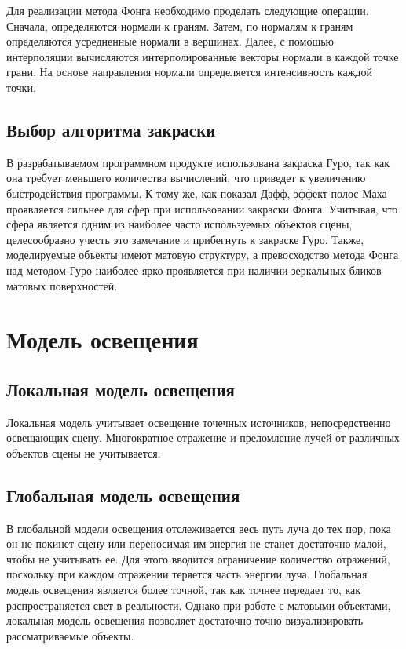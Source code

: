 Для реализации метода Фонга необходимо проделать следующие операции. Сначала, определяются нормали к граням. Затем, по нормалям к граням определяются усредненные нормали в вершинах. Далее, с помощью интерполяции вычисляются интерполированные векторы нормали в каждой точке грани. На основе направления нормали определяется интенсивность каждой точки.






\subsection{Выбор алгоритма закраски}
В разрабатываемом программном продукте использована закраска Гуро, так как она требует меньшего количества вычислений, что приведет к увеличению быстродействия программы. К тому же, как показал Дафф, эффект полос Маха проявляется сильнее для сфер при использовании закраски Фонга. Учитывая, что сфера является одним из наиболее часто используемых объектов сцены, целесообразно учесть это замечание и прибегнуть к закраске Гуро. Также, моделируемые объекты имеют матовую структуру, а превосходство метода Фонга над методом Гуро наиболее ярко проявляется при наличии зеркальных бликов матовых поверхностей.




\section {Модель освещения}

\subsection{Локальная модель освещения}
Локальная модель учитывает освещение точечных источников, непосредственно освещающих сцену. Многократное отражение и преломление лучей от различных объектов сцены не учитывается.

\subsection{Глобальная модель освещения}
В глобальной модели освещения отслеживается весь путь луча до тех пор, пока он не покинет сцену или переносимая им энергия не станет достаточно малой, чтобы не учитывать ее. Для этого вводится ограничение количество отражений, поскольку при каждом отражении теряется часть энергии луча.
Глобальная модель освещения является более точной, так как точнее передает то, как распространяется свет в реальности. Однако при работе с матовыми объектами, локальная модель освещения позволяет достаточно точно визуализировать рассматриваемые объекты.

